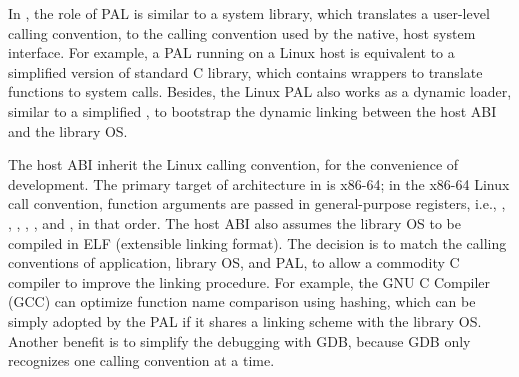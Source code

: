In \graphene{}, the role of PAL is similar to a system library,
which translates a user-level calling convention,
to the calling convention used by the native, host system interface.
For example, a PAL running on a Linux host
is equivalent to a simplified version of standard C library, which contains wrappers to
translate functions to system calls.
Besides, the Linux PAL also works as
a dynamic loader,
similar to a simplified ,
to bootstrap the dynamic linking between the host ABI
and the library OS.
















The host ABI inherit the Linux calling convention,
for the convenience of development.
The primary target of architecture in \graphene{} is x86-64;
in the x86-64 Linux call convention,
function arguments are passed in general-purpose registers, i.e., , , , , , and , in that order.
The host ABI also assumes the library OS to be compiled in ELF (extensible linking format).
The decision is to match the calling conventions
of application, library OS, and PAL,
to allow a commodity C compiler to improve the linking procedure.
For example, the GNU C Compiler (GCC) can optimize function name comparison
using hashing,
which can be simply adopted by the PAL
if it shares a linking scheme with the library OS.
Another benefit is to simplify the debugging with GDB, because GDB only recognizes one calling convention at a time.








